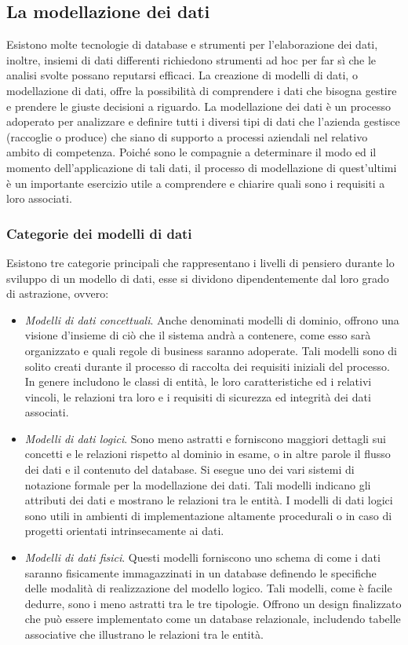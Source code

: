 \subsection{La modellazione dei dati}
Esistono molte tecnologie di database e strumenti per l’elaborazione dei dati, inoltre, insiemi di dati differenti richiedono strumenti ad hoc per far sì che le analisi svolte possano reputarsi efficaci. La creazione di modelli di dati, o modellazione di dati, offre la possibilità di comprendere i dati che bisogna gestire e prendere le giuste decisioni a riguardo.\cite{aws_data_modeling}
La modellazione dei dati è un processo adoperato per analizzare e definire tutti i diversi tipi di dati che l’azienda gestisce (raccoglie o produce) che siano di supporto a processi aziendali nel relativo ambito di competenza. Poiché sono le compagnie a determinare il modo ed il momento dell’applicazione di tali dati, il processo di modellazione di quest’ultimi è un importante esercizio utile a comprendere e chiarire quali sono i requisiti a loro associati.\cite{microsoft_data_modeling}

\subsubsection{Categorie dei modelli di dati}

Esistono tre categorie principali che rappresentano i livelli di pensiero durante lo sviluppo di un modello di dati, esse si dividono dipendentemente dal loro grado di astrazione, ovvero:\cite{ibm_data_modeling}

\begin{itemize}
    \item \textit{Modelli di dati concettuali}. Anche denominati modelli di dominio, offrono una visione d’insieme di ciò che il sistema andrà a contenere, come esso sarà organizzato e quali regole di business saranno adoperate. Tali modelli sono di solito creati durante il processo di raccolta dei requisiti iniziali del processo. In genere includono le classi di entità, le loro caratteristiche ed i relativi vincoli, le relazioni tra loro e i requisiti di sicurezza ed integrità dei dati associati.
    \item \textit{Modelli di dati logici}. Sono meno astratti e forniscono maggiori dettagli sui concetti e le relazioni rispetto al dominio in esame, o in altre parole il flusso dei dati e il contenuto del database. Si esegue uno dei vari sistemi di notazione formale per la modellazione dei dati. Tali modelli indicano gli attributi dei dati e mostrano le relazioni tra le entità. I modelli di dati logici sono utili in ambienti di implementazione altamente procedurali o in caso di progetti orientati intrinsecamente ai dati.
    \item \textit{Modelli di dati fisici}. Questi modelli forniscono uno schema di come i dati saranno fisicamente immagazzinati in un database definendo le specifiche delle modalità di realizzazione del modello logico. Tali modelli, come è facile dedurre, sono i meno astratti tra le tre tipologie. Offrono un design finalizzato che può essere implementato come un database relazionale, includendo tabelle associative che illustrano le relazioni tra le entità.
\end{itemize}

